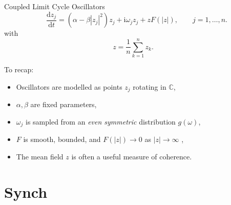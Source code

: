 \documentclass[10pt,reqno]{beamer}
\newcommand{\D}[2]{\frac{\mathrm{d} #1}{\mathrm{d} #2}}
\newcommand{\I}{\mathrm{i}}
\newcommand{\complex}{\mathbb{C}}
\begin{document}
\begin{frame}{Coupled Limit Cycle Oscillators}
\[
 \quad \D{z_j}{t} = (\alpha - \beta|z_j|^2)z_j + \I\omega_jz_j +zF(|z|), \qquad j = 1,\ldots, n.
\]
with 
\[
z=\frac{1}{n}\sum_{k=1}^n z_k.
\]
\vfill

To recap:
\begin{itemize}
	\item Oscillators are modelled as points $z_j$ rotating in $\complex$,
	\item $\alpha, \beta$ are fixed parameters,
	\item $\omega_j$ is sampled from an \emph{even symmetric} distribution $g(\omega)$,  
	\item $F$ is smooth, bounded, and $F(|z|)\rightarrow 0$ as $|z|\rightarrow\infty$ ,
	\item The mean field $z$ is often a useful measure of coherence.
\end{itemize}
\vfill
\end{frame}
\section{Synch}
\end{document}
